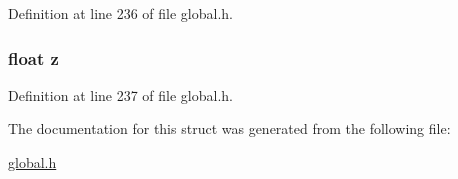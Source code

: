 Definition at line 236 of file global.\-h.

\hypertarget{structfloatVector3d_af73583b1e980b0aa03f9884812e9fd4d}{
\subsubsection[{z}]{\setlength{\rightskip}{0pt plus 5cm}float z}}\label{structfloatVector3d_af73583b1e980b0aa03f9884812e9fd4d}


Definition at line 237 of file global.\-h.



The documentation for this struct was generated from the following file\-:\begin{DoxyCompactItemize}
\item 
\hyperlink{global_8h}{global.\-h}\end{DoxyCompactItemize}
